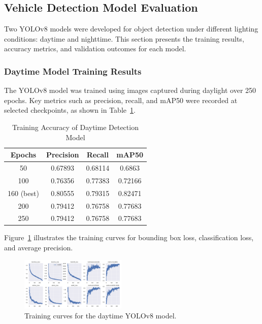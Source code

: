 \subsection{Vehicle Detection Model Evaluation}

Two YOLOv8 models were developed for object detection under different lighting conditions: daytime and nighttime. This section presents the training results, accuracy metrics, and validation outcomes for each model.

\subsubsection{Daytime Model Training Results}

The YOLOv8 model was trained using images captured during daylight over 250 epochs. Key metrics such as precision, recall, and mAP50 were recorded at selected checkpoints, as shown in Table~\ref{table:akurasi_model_siang}.

\begin{table}[H]
\caption{Training Accuracy of Daytime Detection Model}
\label{table:akurasi_model_siang}
\centering
\begin{tabular}{|c|c|c|c|}
\hline
\textbf{Epochs} & \textbf{Precision} & \textbf{Recall} & \textbf{mAP50} \\ \hline
50 & 0.67893 & 0.68114 & 0.6863 \\ \hline
100 & 0.76356 & 0.77383 & 0.72166 \\ \hline
160 (best) & 0.80555 & 0.79315 & 0.82471 \\ \hline
200 & 0.79412 & 0.76758 & 0.77683 \\ \hline
250 & 0.79412 & 0.76758 & 0.77683 \\ \hline
\end{tabular}
\end{table}

Figure~\ref{fig:grafik_model_siang} illustrates the training curves for bounding box loss, classification loss, and average precision.

\begin{figure}[H]
\centering
\includegraphics[width=0.45\textwidth]{gambar/results_siang.png}
\caption{Training curves for the daytime YOLOv8 model.}
\label{fig:grafik_model_siang}
\end{figure}

